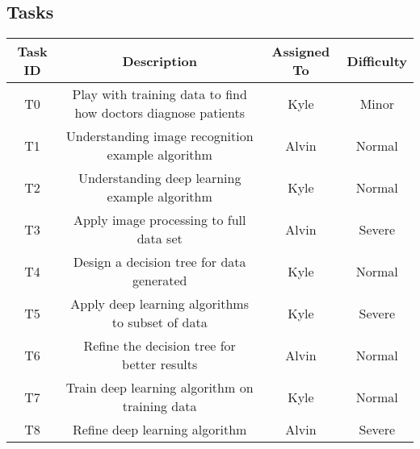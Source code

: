 \documentclass[12pt]{article}
\begin{document}
\subsection{Tasks}
\begin{center}
	\begin{tabular}{|c|c|c|c|}
		\hline
		Task ID & Description & Assigned To & Difficulty \\
		\hline
		T0 & Play with training data to find how doctors diagnose patients & Kyle & Minor \\
		T1 & Understanding image recognition example algorithm & Alvin & Normal \\
		T2 & Understanding deep learning example algorithm & Kyle & Normal \\
		T3 & Apply image processing to full data set & Alvin & Severe \\
		T4 & Design a decision tree for data generated & Kyle & Normal \\
		T5 & Apply deep learning algorithms to subset of data & Kyle & Severe \\
		T6 & Refine the decision tree for better results & Alvin & Normal \\
		T7 & Train deep learning algorithm on training data & Kyle & Normal \\
		T8 & Refine deep learning algorithm & Alvin & Severe \\
		\hline
	\end{tabular}
\end{center}
\end{document}
